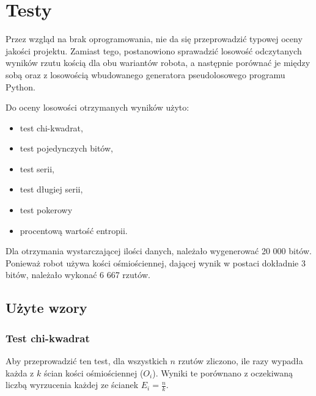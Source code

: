 \chapter{Testy}

Przez wzgląd na brak oprogramowania, nie da się przeprowadzić typowej oceny jakości projektu. Zamiast tego, postanowiono 
sprawadzić losowość odczytanych wyników rzutu kością dla obu wariantów robota, a następnie porównać je między sobą oraz
z losowością wbudowanego generatora pseudolosowego programu Python.

Do oceny losowości otrzymanych wyników użyto:
\begin{itemize}
    \item test chi-kwadrat,
    \item test pojedynczych bitów,
    \item test serii,
    \item test długiej serii,
    \item test pokerowy
    \item procentową wartość entropii.
\end{itemize}

Dla otrzymania wystarczającej ilości danych, należało wygenerować 20 000 bitów. Ponieważ robot używa kości ośmiościennej,
dającej wynik w postaci dokładnie 3 bitów, należało wykonać 6 667 rzutów.

\section{Użyte wzory}

\subsection{Test chi-kwadrat}
Aby przeprowadzić ten test, dla wszystkich \begin{math} n \end{math} rzutów zliczono, ile razy wypadła każda z 
\begin{math} k \end{math} ścian kości ośmiościennej (\begin{math}O_i\end{math}). Wyniki te porównano z oczekiwaną
liczbą wyrzucenia każdej ze ścianek \begin{math}E_i = \frac{n}{k}\end{math}.


